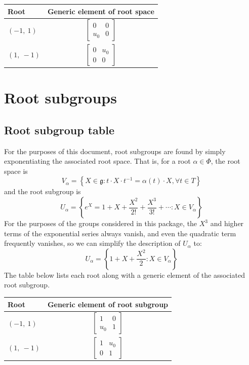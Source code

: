 \documentclass[11pt]{article}
\newcommand{\noi}{\noindent}
\newcommand{\inv}{^{-1}}
\newcommand{\lb}{\left\{}
\newcommand{\rb}{\right\}}
\newcommand{\frakg}{\mathfrak{g}}
\theoremstyle{definition}
\begin{document}
\noindent \begin{longtable}{|l|c|}
    \hline
    \textbf{Root} & \textbf{Generic element of root space} \\
    \hline
    \endhead
    $\left( -1, \  1\right)$ & ${\left[\begin{matrix}0 & 0\\u_{0} & 0\end{matrix}\right]}$ \\
    \hline
    $\left( 1, \  -1\right)$ & ${\left[\begin{matrix}0 & u_{0}\\0 & 0\end{matrix}\right]}$ \\
    \hline
\end{longtable}


\newpage
\section{Root subgroups}

\subsection{Root subgroup table}

\noi For the purposes of this document, root subgroups are found by simply exponentiating the associated root space. That is, for a root $\alpha \in \Phi$, the root space is
\[
	V_\alpha = \lb X \in \frakg : t \cdot X \cdot t \inv = \alpha(t) \cdot X, \forall t \in T \rb
\]
and the root subgroup is
\[
	U_\alpha = \lb e^X = 1 + X + \frac{X^2}{2!} + \frac{X^3}{3!} + \cdots : X \in V_\alpha \rb
\]
For the purposes of the groups considered in this package, the $X^3$ and higher terms of the exponential series always vanish, and even the quadratic term frequently vanishes, so we can simplify the description of $U_\alpha$ to:
\[
	U_\alpha = \lb 1 + X + \frac{X^2}{2} : X \in V_\alpha \rb
\]
The table below lists each root along with a generic element of the associated root subgroup.

\noindent \begin{longtable}{|l|c|}
    \hline
    \textbf{Root} & \textbf{Generic element of root subgroup} \\
    \hline
    \endhead
    $\left( -1, \  1\right)$ & ${\left[\begin{matrix}1 & 0\\u_{0} & 1\end{matrix}\right]}$ \\
    \hline
    $\left( 1, \  -1\right)$ & ${\left[\begin{matrix}1 & u_{0}\\0 & 1\end{matrix}\right]}$ \\
    \hline
\end{longtable}
\end{document}
